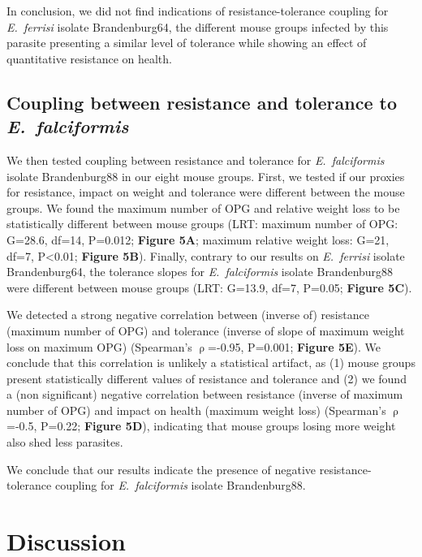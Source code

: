 \documentclass[12pt]{article}
\begin{document}
In conclusion, we did not find indications of resistance-tolerance coupling for \textit{E.~ferrisi} isolate Brandenburg64, the different mouse groups infected by this parasite presenting a similar level of tolerance while showing an effect of quantitative resistance on health.\par

\subsection{Coupling between resistance and tolerance to \textit{E.~falciformis}}

We then tested coupling between resistance and tolerance for \textit{E.~falciformis} isolate Brandenburg88 in our eight mouse groups. First, we tested if our proxies for resistance, impact on weight and tolerance were different between the mouse groups. We found the maximum number of OPG and relative weight loss to be statistically different between mouse groups (LRT: maximum number of OPG: G=28.6, df=14, P=0.012; \textbf{Figure 5A}; maximum relative weight loss: G=21, df=7, P<0.01; \textbf{Figure 5B}). Finally, contrary to our results on \textit{E.~ferrisi} isolate Brandenburg64, the tolerance slopes for \textit{E.~falciformis} isolate Brandenburg88 were different between mouse groups (LRT: G=13.9, df=7, P=0.05; \textbf{Figure 5C}).\par

We detected a strong negative correlation between (inverse of) resistance (maximum number of OPG) and tolerance (inverse of slope of maximum weight loss on maximum OPG) (Spearman's $\uprho$=-0.95, P=0.001; \textbf{Figure 5E}). We conclude that this correlation is unlikely a statistical artifact, as (1) mouse groups present statistically different values of resistance and tolerance and (2) we found a (non significant) negative correlation between resistance (inverse of maximum number of OPG) and impact on health (maximum weight loss) (Spearman's $\uprho$=-0.5, P=0.22; \textbf{Figure 5D}), indicating that mouse groups losing more weight also shed less parasites. \par

We conclude that our results indicate the presence of negative resistance-tolerance coupling for \textit{E.~falciformis} isolate Brandenburg88.

\section*{Discussion}
\end{document}

